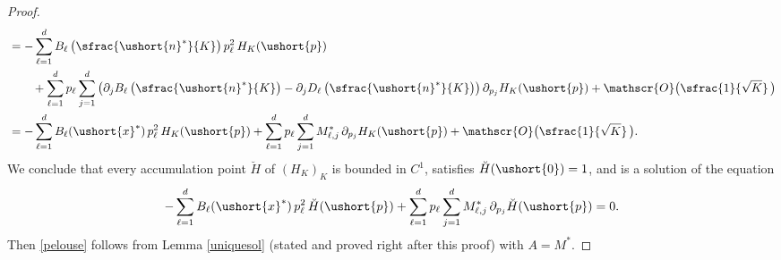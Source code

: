 \documentclass[JEP,XML,SOM,Unicode]{cedram}
\let\mathcal\mathscr
\numberwithin{equation}{section}
\theoremstyle{plain}
\theoremstyle{definition}
\newcommand{\sK}{K}
\newcommand{\vecnf}{\ushort{n}^*}
\newcommand{\vecxf}{\ushort{x}^*}
\newcommand{\vp}{\ushort{p}}
\begin{document}
\begin{proof}
\begin{align*}
& = -\sum_{\ell=1}^{d}B_{\ell}\left(\sfrac{\vecnf}{K}\right) p_{\ell}^2\, H_{\sK}(\vp)\\
& \qquad +\sum_{\ell=1}^{d}p_{\ell}
\sum_{j=1}^{d}\left(\partial_{j}B_{\ell}\left(\sfrac{\vecnf}{K}\right)-\partial_{j}D_{\ell}\left(\sfrac{\vecnf}{K}\right)\right)\partial_{p_{j}}H_{\sK}(\vp)+\mathcal{O}\bigl(\sfrac{1}{\sqrt{K}}\,\bigr)\\
& =-\sum_{\ell=1}^{d}B_{\ell}(\vecxf)\,p_{\ell}^2\,H_{\sK}(\vp)+\sum_{\ell=1}^{d} p_{\ell}\sum_{j=1}^{d}
M_{\ell,j}^*\,\partial_{p_{j}}H_{\sK}(\vp)+\mathcal{O}\bigl(\sfrac{1}{\sqrt{K}}\,\bigr).
\end{align*}
We conclude that every accumulation point $\breve{H}$ of $(H_{\sK})_{\sK}$ is bounded in
$C^{1}$, satisfies $\breve{H}(\ushort{0})=1$, and is a solution of the equation
\[
-\sum_{\ell=1}^{d}B_{\ell}(\vecxf)\,p_{\ell}^2\,\breve{H}(\vp)+\sum_{\ell=1}^{d} p_{\ell}\sum_{j=1}^{d}
M_{\ell,j}^*\,\partial_{p_{j}}\breve{H}(\vp)=0.
\]
Then \eqref{pelouse} follows from Lemma \ref{uniquesol} (stated and proved right after this proof) with $A=M^*$.
\end{proof}
\end{document}
